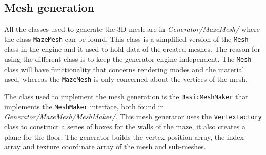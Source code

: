 \subsection{Mesh generation}
All the classes used to generate the 3D mesh are in {\em Generator/MazeMesh/} where the class \texttt{MazeMesh} can be found. This class is a simplified version of the \texttt{Mesh} class in the engine and it used to hold data of the created meshes. The reason for using the different class is to keep the generator engine-independent. The \texttt{Mesh} class will have functionality that concerns rendering modes and the material used, whereas the \texttt{MazeMesh} is only concerned about the vertices of the mesh.

The class used to implement the mesh generation is the \texttt{BasicMeshMaker} that implements the \texttt{MeshMaker} interface, both found in {\em Generator/MazeMesh/MeshMaker/}. This mesh generator uses the \texttt{VertexFactory} class to construct a series of boxes for the walls of the maze, it also creates a plane for the floor. The generator builds the vertex position array, the index array and texture coordinate array of the mesh and sub-meshes.
\lstCpp
